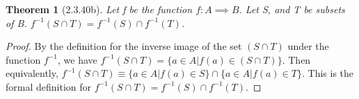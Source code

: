 \documentclass[a4paper, 12pt]{article}
\theoremstyle{plain}
\newtheorem*{theorem*}{Theorem}
\begin{document}
	
	\begin{theorem*}[2.3.40b]
		Let f be the function $f: A \implies B$. Let S, and T be subsets of B. 
		$f^{-1}(S \cap T) = f^{-1}(S) \cap f^{-1}(T)$.
	\end{theorem*}
	
	\begin{proof}
		By the definition for the inverse image of the set $(S \cap T)$ under the function 
		$f^{-1}$, we have $f^{-1}(S \cap T) = \{a \in A | f(a) \in (S \cap T)\}$. Then 
		\newline equivalently, 
		$f^{-1}(S \cap T) \equiv \{a \in A | f(a) \in S\} \cap \{a \in A | f(a) \in T\}$. This 
		is the formal definition for $f^{-1}(S \cap T) = f^{-1}(S) \cap f^{-1}(T)$.
	\end{proof}
\end{document}
